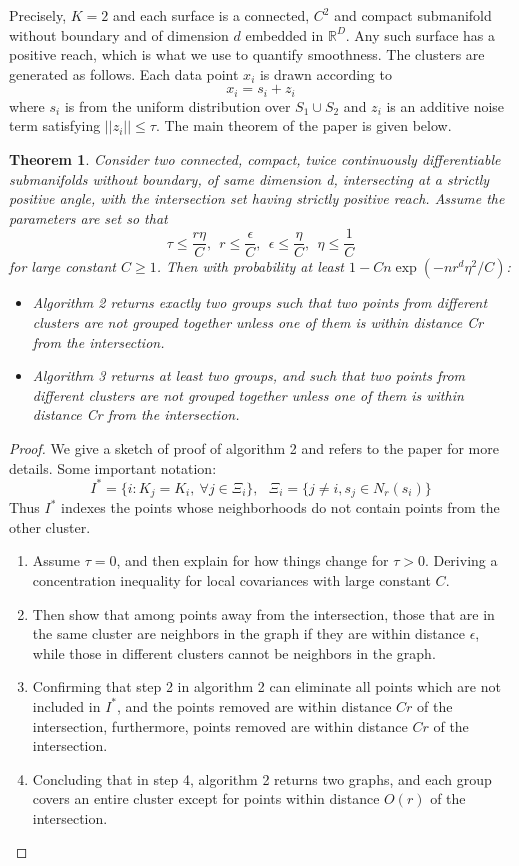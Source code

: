 \documentclass[11pt,reqno]{amsart}
\numberwithin{equation}{section}
\theoremstyle{plain}
\newtheorem{thm}{Theorem}[section]
\begin{document}
Precisely, $K=2$ and each surface is a connected, $C^2$ and compact submanifold without boundary
and of dimension $d$ embedded in $\mathbb R^D$. Any such surface has a positive reach, which is what
we use to quantify smoothness. The clusters are generated as follows. Each data point $x_i$
is drawn according to
$$
x_i = s_i + z_i
$$
where $s_i$ is from the uniform distribution over $S_1\cup S_2$ and $z_i$ is an additive noise
term satisfying $||z_i||\le \tau$. The main theorem of the paper is given below.
\begin{thm}
Consider two connected, compact, twice continuously differentiable submanifolds
without boundary, of same dimension d, intersecting at a strictly positive angle, with
the intersection set having strictly positive reach. Assume the parameters are set so that
$$
\tau\le \frac{r\eta}{C},\ \ r\le\frac{\epsilon}{C},\ \ \epsilon\le\frac{\eta}{C},\ \ \eta\le\frac{1}{C}
$$
for large constant $C\ge 1$. Then with probability
at least $1-Cn\exp(- nr^d\eta^2/C)$:
\begin{itemize}
\item Algorithm 2 returns exactly two groups such that two points from different clusters are
not grouped together unless one of them is within distance Cr from the intersection.
\item Algorithm 3 returns at least two groups, and such that two points from different clusters
are not grouped together unless one of them is within distance Cr from the intersection.
\end{itemize}
\end{thm}
\begin{proof}
We give a sketch of proof of algorithm 2 and refers to the paper for more details. Some important notation:
$$
I^*=\{i: K_j=K_i,\ \forall j\in\Xi_i  \},\ \ \ \Xi_i=\{j\ne i, s_j\in N_r(s_i)   \}
$$
Thus $I^*$ indexes the points whose neighborhoods do not contain points from the other cluster.

\begin{enumerate}
\item Assume $\tau=0$, and then explain for how things change for $\tau>0$. Deriving a concentration inequality for local covariances with large constant $C$.
\item Then show that among points away from the intersection, those that are in the same cluster are neighbors in the graph if
they are within distance $\epsilon$, while those in different clusters cannot be neighbors in the graph.
\item Confirming that step 2 in algorithm 2 can eliminate all points which are not included in $I^*$, and  the points removed are within distance $Cr$ of the intersection, furthermore,  points removed are within distance $Cr$ of the intersection.
\item Concluding that in step 4, algorithm 2 returns two graphs, and each group covers an entire cluster except for points within distance $O(r)$ of the intersection.
\end{enumerate}
\end{proof}
\end{document}
